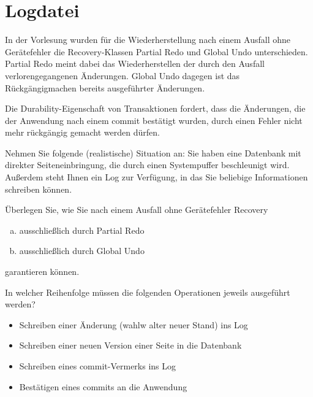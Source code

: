 \section{Logdatei}

In der Vorlesung wurden für die Wiederherstellung nach einem Ausfall ohne Gerätefehler die Recovery-Klassen Partial Redo und Global Undo unterschieden. Partial Redo meint dabei das Wiederherstellen der durch den Ausfall verlorengegangenen Änderungen. Global Undo dagegen ist das Rückgängigmachen bereits ausgeführter Änderungen.

Die Durability-Eigenschaft von Transaktionen fordert, dass die Änderungen, die der Anwendung nach einem commit bestätigt wurden, durch einen Fehler nicht mehr rückgängig gemacht werden dürfen.

Nehmen Sie folgende (realistische) Situation an:
Sie haben eine Datenbank mit direkter Seiteneinbringung, die durch einen Systempuffer beschleunigt wird. Außerdem steht Ihnen ein Log zur Verfügung, in das Sie beliebige Informationen schreiben können.

Überlegen Sie, wie Sie nach einem Ausfall ohne Gerätefehler Recovery
\begin{enumerate}[a)]
	\item ausschließlich durch Partial Redo
	\item ausschließlich durch Global Undo
\end{enumerate}
garantieren können.

In welcher Reihenfolge müssen die folgenden Operationen jeweils ausgeführt werden?
\begin{itemize}
	\item Schreiben einer Änderung (wahlw alter neuer Stand) ins Log
	\item Schreiben einer neuen Version einer Seite in die Datenbank
	\item Schreiben eines commit-Vermerks ins Log
	\item Bestätigen eines commits an die Anwendung
\end{itemize}

